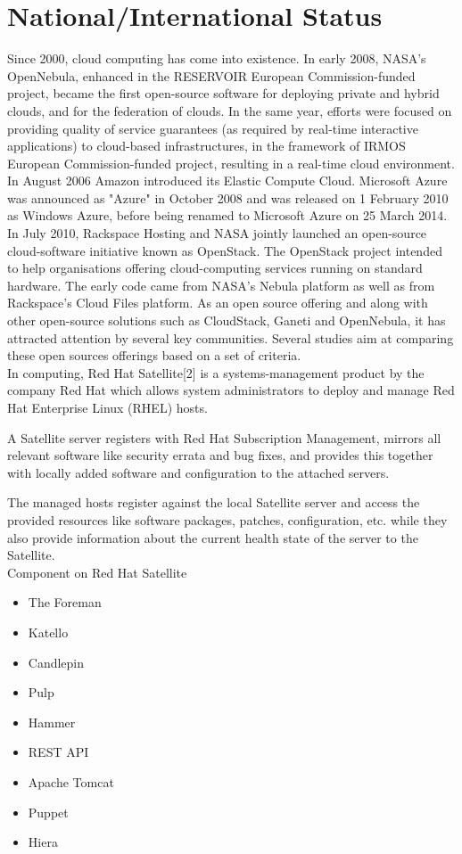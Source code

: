 \documentclass[a4paper,12pt]{report}
\begin{document}
\chapter{National/International Status}

Since 2000, cloud computing has come into existence. In early 2008, NASA's OpenNebula, enhanced in the RESERVOIR European Commission-funded project, became the first open-source software for deploying private and hybrid clouds, and for the federation of clouds. In the same year, efforts were focused on providing quality of service guarantees (as required by real-time interactive applications) to cloud-based infrastructures, in the framework of IRMOS European Commission-funded project, resulting in a real-time cloud environment.\\

In August 2006 Amazon introduced its Elastic Compute Cloud. Microsoft Azure was announced as "Azure" in October 2008 and was released on 1 February 2010 as Windows Azure, before being renamed to Microsoft Azure on 25 March 2014.\\

In July 2010, Rackspace Hosting and NASA jointly launched an open-source cloud-software initiative known as OpenStack. The OpenStack project intended to help organisations offering cloud-computing services running on standard hardware. The early code came from NASA's Nebula platform as well as from Rackspace's Cloud Files platform. As an open source offering and along with other open-source solutions such as CloudStack, Ganeti and OpenNebula, it has attracted attention by several key communities. Several studies aim at comparing these open sources offerings based on a set of criteria.\\
In computing, Red Hat Satellite[2] is a systems-management product by the company Red Hat which allows system administrators to deploy and manage Red Hat Enterprise Linux (RHEL) hosts.

A Satellite server registers with Red Hat Subscription Management, mirrors all relevant software like security errata and bug fixes, and provides this together with locally added software and configuration to the attached servers.

The managed hosts register against the local Satellite server and access the provided resources like software packages, patches, configuration, etc. while they also provide information about the current health state of the server to the Satellite. \\
Component on Red Hat Satellite
\begin{itemize}
	\item The Foreman
	\item Katello
	\item Candlepin
	\item Pulp
	\item Hammer
	\item REST API
	\item Apache Tomcat
	\item Puppet
	\item Hiera
\end{itemize}
\end{document}
